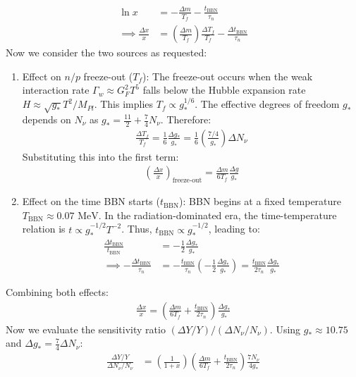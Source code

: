 \begin{align}
    \ln x &= -\frac{\Delta m}{T_f} - \frac{t_{\text{BBN}}}{\tau_n} \\
    \implies \frac{\Delta x}{x} &= \left( \frac{\Delta m}{T_f} \right) \frac{\Delta T_f}{T_f} - \frac{\Delta t_{\text{BBN}}}{\tau_n}
\end{align}
Now we consider the two sources as requested:
\begin{enumerate}
    \item Effect on $n/p$ freeze-out ($T_f$): The freeze-out occurs when the weak interaction rate $\Gamma_w \approx G_F^2 T^5$ falls below the Hubble expansion rate $H \approx \sqrt{g_*} T^2 / M_{Pl}$. This implies $T_f \propto g_*^{1/6}$.
    The effective degrees of freedom $g_*$ depends on $N_\nu$ as $g_* = \frac{11}{2} + \frac{7}{4} N_\nu$. Therefore:
    \begin{align}
    \frac{\Delta T_f}{T_f} = \frac{1}{6} \frac{\Delta g_*}{g_*} = \frac{1}{6} \left( \frac{7/4}{g_*} \right) \Delta N_\nu
    \end{align}
Substituting this into the first term:
\begin{align}
\left( \frac{\Delta x}{x} \right)_{\text{freeze-out}} = \frac{\Delta m}{6 T_f} \frac{\Delta g}{g_*}
\end{align}
\item Effect on the time BBN starts ($t_{\text{BBN}}$):
BBN begins at a fixed temperature $T_{\text{BBN}} \approx 0.07 \text{ MeV}$. In the radiation-dominated era, the time-temperature relation is $t \propto g_*^{-1/2} T^{-2}$. Thus, $t_{\text{BBN}} \propto g_*^{-1/2}$, leading to:
\begin{align}
\frac{\Delta t_{\text{BBN}}}{t_{\text{BBN}}} &= -\frac{1}{2} \frac{\Delta g_*}{g_*} \\
\implies -\frac{\Delta t_{\text{BBN}}}{\tau_n} &= - \frac{t_{\text{BBN}}}{\tau_n} \left( -\frac{1}{2} \frac{\Delta g_*}{g_*} \right) = \frac{t_{\text{BBN}}}{2 \tau_n} \frac{\Delta g_*}{g_*}
\end{align}
\end{enumerate}
Combining both effects:
\begin{align}
    \frac{\Delta x}{x} = \left( \frac{\Delta m}{6 T_f} + \frac{t_{\text{BBN}}}{2 \tau_n} \right) \frac{\Delta g_*}{g_*}
\end{align}
Now we evaluate the sensitivity ratio $(\Delta Y/Y) / (\Delta N_\nu / N_\nu)$. Using $g_* \approx 10.75$ and $\Delta g_* = \frac{7}{4} \Delta N_\nu$:
    \begin{align}\frac{\Delta Y/Y}{\Delta N_\nu / N_\nu} &= \left( \frac{1}{1+x} \right) \left( \frac{\Delta m}{6 T_f} + \frac{t_{\text{BBN}}}{2 \tau_n} \right) \frac{7 N_\nu}{4 g_*}
\end{align}

